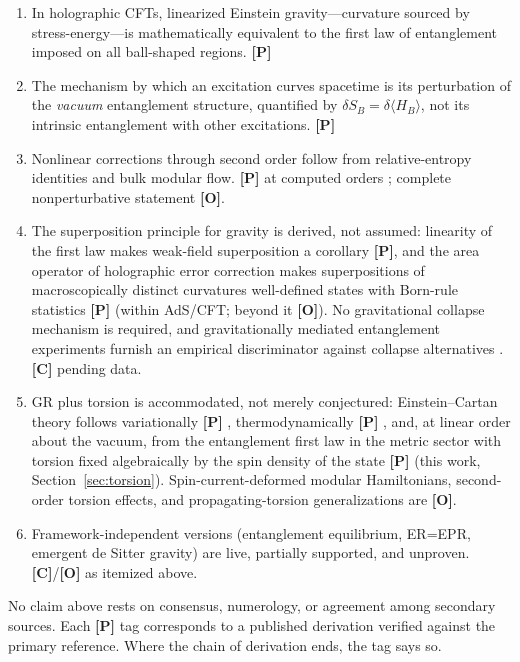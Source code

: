 \documentclass[11pt]{article}
\theoremstyle{definition}
\newcommand{\pP}{\textbf{[P]}}
\newcommand{\pC}{\textbf{[C]}}
\newcommand{\pO}{\textbf{[O]}}
\begin{document}
\begin{enumerate}[itemsep=1pt]
\item In holographic CFTs, linearized Einstein gravity---curvature sourced by
stress-energy---is mathematically equivalent to the first law of entanglement
imposed on all ball-shaped regions. \pP{} \cite{Lashkari2014,Faulkner2014}
\item The mechanism by which an excitation curves spacetime is its
perturbation of the \emph{vacuum} entanglement structure, quantified by
$\delta S_B=\delta\langle H_B\rangle$, not its intrinsic entanglement with
other excitations. \pP{}
\item Nonlinear corrections through second order follow from relative-entropy
identities and bulk modular flow. \pP{} at computed orders
\cite{Faulkner2017}; complete nonperturbative statement \pO{}.
\item The superposition principle for gravity is derived, not assumed:
linearity of the first law makes weak-field superposition a corollary
\pP{}, and the area operator of holographic error correction
\cite{Harlow2017} makes superpositions of macroscopically distinct
curvatures well-defined states with Born-rule statistics \pP{} (within
AdS/CFT; beyond it \pO{}). No gravitational collapse mechanism is required,
and gravitationally mediated entanglement experiments
\cite{Bose2017,MarlettoVedral2017} furnish an empirical discriminator
against collapse alternatives \cite{Penrose1996}. \pC{} pending data.
\item GR plus torsion is accommodated, not merely conjectured:
Einstein--Cartan theory follows variationally \pP{}
\cite{Kibble1961,Sciama1964,HehlRMP1976}, thermodynamically \pP{}
\cite{DLP2017,DDS2018,JacobsonMohd2015}, and, at linear order about the
vacuum, from the entanglement first law in the metric sector with torsion
fixed algebraically by the spin density of the state \pP{} (this work,
Section~\ref{sec:torsion}). Spin-current-deformed modular Hamiltonians,
second-order torsion effects, and propagating-torsion generalizations are
\pO{}.
\item Framework-independent versions (entanglement equilibrium, ER=EPR,
emergent de Sitter gravity) are live, partially supported, and unproven.
\pC{}/\pO{} as itemized above.
\end{enumerate}

No claim above rests on consensus, numerology, or agreement among secondary
sources. Each \pP{} tag corresponds to a published derivation verified against
the primary reference. Where the chain of derivation ends, the tag says so.
\end{document}

